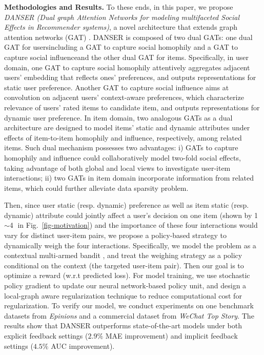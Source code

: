 \documentclass[sigconf]{acmart}
\begin{document}
\textbf{Methodologies and Results.} To these ends, in this paper, we propose \emph{DANSER (Dual graph Attention Networks for modeling multifaceted Social Effects in Recommender systems)}, a novel architecture that extends graph attention networks (GAT) \cite{GAT}. DANSER is composed of two dual GATs: one dual GAT for users{\textemdash}including a GAT to capture social homophily and a GAT to capture social influence{\textemdash}and the other dual GAT for items. Specifically, in user domain, one GAT to capture social homophily attentively aggregates adjacent users' embedding that reflects ones' preferences, and outputs representations for static user preference. 
Another GAT to capture social influence aims at convolution on adjacent users' context-aware preferences, which characterize relevance of users' rated items to candidate item, and outputs representations for dynamic user preference. 
In item domain, two analogous GATs as a dual architecture are designed to model items' static and dynamic attributes under effects of item-to-item homophily and influence, respectively, among related items. 
Such dual mechanism possesses two advantages: i) GATs to capture homophily and influence could collaboratively model two-fold social effects, taking advantage of both global and local views to investigate user-item interactions; ii) two GATs in item domain incorporate information from related items, which could further alleviate data sparsity problem.

Then, since user static ({resp.} dynamic) preference as well as item static ({resp.} dynamic) attribute could jointly affect a user's decision on one item (shown by \textcircled{1}$\sim$\textcircled{4} in Fig.~\ref{fig-motivation}) and the importance of these four interactions would vary for distinct user-item pairs, we propose a policy-based strategy to dynamically weigh the four interactions. 
Specifically, we model the problem as a contextual multi-armed bandit \cite{Multi-armed}, and treat the weighing strategy as a policy conditional on the context (the targeted user-item pair). 
Then our goal is to optimize a reward (w.r.t predicted loss). 
For model training, we use stochastic policy gradient to update our neural network-based policy unit, and design a local-graph aware regularization technique to reduce computational cost for regularization. 
To verify our model, we conduct experiments on one benchmark datasets from \textit{Epinions} and a commercial dataset from \textit{WeChat Top Story}. The results show that DANSER outperforms state-of-the-art models under both explicit feedback settings ($2.9\%$ MAE improvement) and implicit feedback settings ($4.5\%$ AUC improvement).
\end{document}
